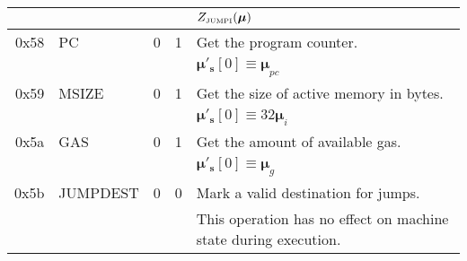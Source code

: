 \documentclass[9pt,oneside]{amsart}
\begin{document}
\begin{tabular*}{\columnwidth}[h]{rlrrl}
&&&& $Z_{\text{\tiny JUMPI}}(\boldsymbol{\mu}) $ \\
\midrule
0x58 & {\small PC} & 0 & 1 & Get the program counter. \\
&&&& $\boldsymbol{\mu}'_\mathbf{s}[0] \equiv \boldsymbol{\mu}_{pc}$ \\
\midrule
0x59 & {\small MSIZE} & 0 & 1 & Get the size of active memory in bytes. \\
&&&& $\boldsymbol{\mu}'_\mathbf{s}[0] \equiv 32\boldsymbol{\mu}_{i}$ \\
\midrule
0x5a & {\small GAS} & 0 & 1 & Get the amount of available gas. \\
&&&& $\boldsymbol{\mu}'_\mathbf{s}[0] \equiv \boldsymbol{\mu}_{g}$ \\
\midrule
0x5b & {\small JUMPDEST} & 0 & 0 & Mark a valid destination for jumps. \\
&&&& This operation has no effect on machine state during execution. \\
\bottomrule
\end{tabular*}
\end{document}
